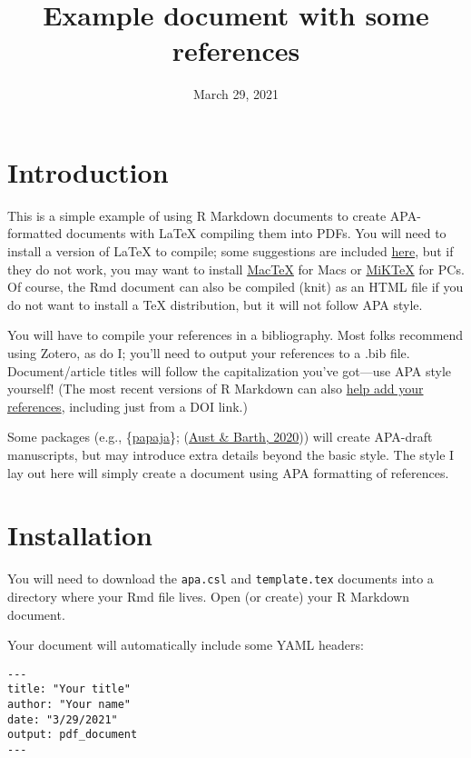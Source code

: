 \documentclass[jou]{apa7}
\title{Example document with some references}
\date{March 29, 2021}
\begin{document}
\maketitle

\hypertarget{introduction}{%
\section{Introduction}\label{introduction}}

This is a simple example of using R Markdown documents to create
APA-formatted documents with LaTeX compiling them into PDFs. You will
need to install a version of LaTeX to compile; some suggestions are
included
\href{https://bookdown.org/yihui/rmarkdown-cookbook/install-latex.html}{here},
but if they do not work, you may want to install
\href{http://tug.org/mactex/}{MacTeX} for Macs or
\href{https://miktex.org/}{MiKTeX} for PCs. Of course, the Rmd document
can also be compiled (knit) as an HTML file if you do not want to
install a TeX distribution, but it will not follow APA style.

You will have to compile your references in a bibliography. Most folks
recommend using Zotero, as do I; you'll need to output your references
to a .bib file. Document/article titles will follow the capitalization
you've got---use APA style yourself! (The most recent versions of R
Markdown can also
\href{https://rmarkdown.rstudio.com/authoring_bibliographies_and_citations.html}{help
add your references}, including just from a DOI link.)

Some packages (e.g., \{\href{https://github.com/crsh/papaja}{papaja}\};
(\protect\hyperlink{ref-austbarth2020}{Aust \& Barth, 2020})) will
create APA-draft manuscripts, but may introduce extra details beyond the
basic style. The style I lay out here will simply create a document
using APA formatting of references.

\hypertarget{installation}{%
\section{Installation}\label{installation}}

You will need to download the \texttt{apa.csl} and \texttt{template.tex}
documents into a directory where your Rmd file lives. Open (or create)
your R Markdown document.

Your document will automatically include some YAML headers:

\begin{verbatim}
---
title: "Your title"
author: "Your name"
date: "3/29/2021"
output: pdf_document
---
\end{verbatim}
\end{document}
